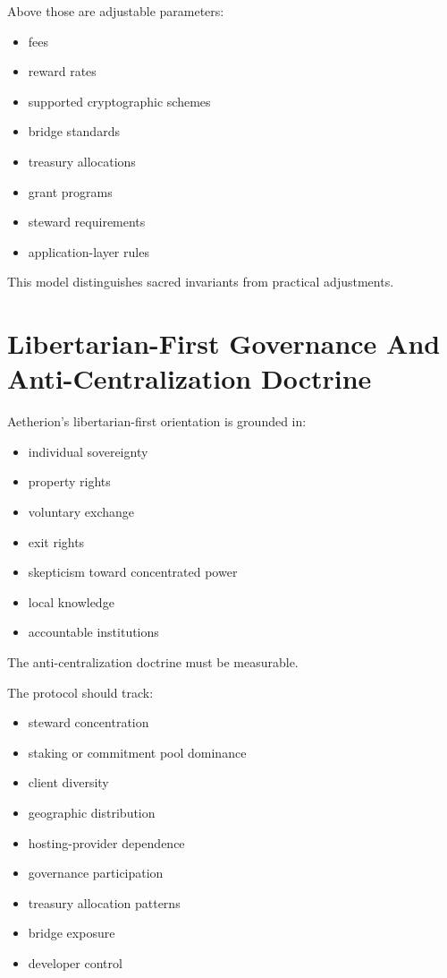﻿\documentclass[12pt]{article}
\begin{document}
Above those are adjustable parameters:

\begin{itemize}
  \item fees
  \item reward rates
  \item supported cryptographic schemes
  \item bridge standards
  \item treasury allocations
  \item grant programs
  \item steward requirements
  \item application-layer rules
\end{itemize}

This model distinguishes sacred invariants from practical adjustments.

\section{Libertarian-First Governance And Anti-Centralization Doctrine}


Aetherion's libertarian-first orientation is grounded in:

\begin{itemize}
  \item individual sovereignty
  \item property rights
  \item voluntary exchange
  \item exit rights
  \item skepticism toward concentrated power
  \item local knowledge
  \item accountable institutions
\end{itemize}

The anti-centralization doctrine must be measurable.

The protocol should track:

\begin{itemize}
  \item steward concentration
  \item staking or commitment pool dominance
  \item client diversity
  \item geographic distribution
  \item hosting-provider dependence
  \item governance participation
  \item treasury allocation patterns
  \item bridge exposure
  \item developer control
\end{itemize}
\end{document}
